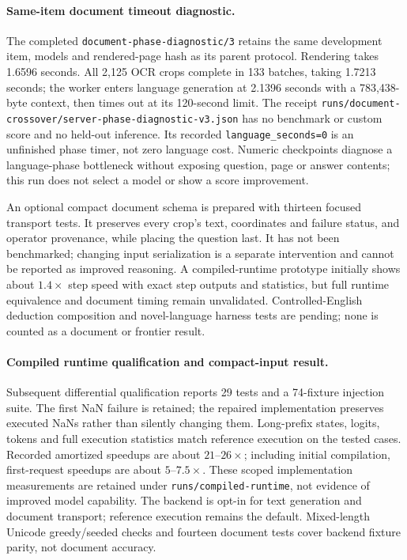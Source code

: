 \documentclass[11pt]{article}
\begin{document}
\paragraph{Same-item document timeout diagnostic.}
The completed \texttt{document-phase-diagnostic/3} retains the same development
item, models and rendered-page hash as its parent protocol. Rendering takes
1.6596 seconds. All 2{,}125 OCR crops complete in 133 batches, taking 1.7213
seconds; the worker enters language generation at 2.1396 seconds with a
783{,}438-byte context, then times out at its 120-second limit. The receipt
\texttt{runs/document-crossover/server-phase-diagnostic-v3.json} has no
benchmark or custom score and no held-out inference. Its recorded
\texttt{language\_seconds=0} is an unfinished phase timer, not zero language
cost. Numeric checkpoints diagnose a language-phase bottleneck without exposing
question, page or answer contents; this run does not select a model or show a
score improvement.

An optional compact document schema is prepared with thirteen focused transport
tests. It preserves every crop's text, coordinates and failure status, and
operator provenance, while placing the question last. It has not been
benchmarked; changing input serialization is a separate intervention and cannot
be reported as improved reasoning. A compiled-runtime prototype initially shows
about $1.4\times$ step speed with exact step outputs and statistics, but full
runtime equivalence and document timing remain unvalidated. Controlled-English
deduction composition and novel-language harness tests are pending; none is
counted as a document or frontier result.

\paragraph{Compiled runtime qualification and compact-input result.}
Subsequent differential qualification reports 29 tests and a 74-fixture
injection suite. The first NaN failure is retained; the repaired implementation
preserves executed NaNs rather than silently changing them. Long-prefix states,
logits, tokens and full execution statistics match reference execution on the
tested cases. Recorded amortized speedups are about $21$--$26\times$;
including initial compilation, first-request speedups are about $5$--$7.5\times$.
These scoped implementation measurements are retained under
\texttt{runs/compiled-runtime}, not evidence of improved model capability.
The backend is opt-in for text generation and document transport; reference
execution remains the default. Mixed-length Unicode greedy/seeded checks and
fourteen document tests cover backend fixture parity, not document accuracy.
\end{document}
